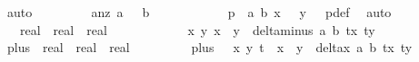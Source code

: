 \begin{isabellebody}
\ auto\ \isanewline
\ \ \ \ \ \ \isamarkupfalse%
\ a{}{\isacharunderscore}nz{\isacharcolon}\ {\isachardoublequoteopen}a{}\ {\isasymnoteq}\ {}{\isachardoublequoteclose}\ {\isachardoublequoteopen}b{}\ {\isasymnoteq}\ {}{\isachardoublequoteclose}\isanewline
\ \ \ \ \ \ \ \ \isamarkupfalse%
\ {\isacartoucheopen}p\ {\isacharequal}\ {\isacharparenleft}a{}{\isacharcomma}\ b{}{\isacharparenright}{\isacartoucheclose}\ {\isacartoucheopen}x{}\ {\isasymnoteq}\ {}{\isacartoucheclose}\ {\isacartoucheopen}y{}\ {\isasymnoteq}\ {}{\isacartoucheclose}\ p{\isacharunderscore}def\ \isamarkupfalse%
\ auto\isanewline
\ \ \ \ \ \ \isamarkupfalse%
\ {\isasymdelta}{\isacharprime}\ {\isacharcolon}{\isacharcolon}\ {\isachardoublequoteopen}real\ {\isasymRightarrow}\ real\ {\isasymRightarrow}\ real{\isachardoublequoteclose}\ \ \isanewline
\ \ \ \ \ \ \ \ {\isachardoublequoteopen}{\isasymdelta}{\isacharprime}{\isacharequal}\ {\isacharparenleft}{\isasymlambda}\ x{}\ y{}{\isachardot}\ x{}\ {\isacharasterisk}\ y{}\ {\isacharasterisk}\ delta{\isacharunderscore}minus\ a{}\ b{}\ {\isacharparenleft}{}{\isacharslash}{\isacharparenleft}t{\isacharasterisk}x{}{\isacharparenright}{\isacharparenright}\ {\isacharparenleft}{}{\isacharslash}{\isacharparenleft}t{\isacharasterisk}y{}{\isacharparenright}{\isacharparenright}{\isacharparenright}{\isachardoublequoteclose}\ \isanewline
\ \ \ \ \ \ \isamarkupfalse%
\ {\isasymdelta}{\isacharunderscore}plus\ {\isacharcolon}{\isacharcolon}\ {\isachardoublequoteopen}real\ {\isasymRightarrow}\ real\ {\isasymRightarrow}\ real{\isachardoublequoteclose}\ \isanewline
\ \ \ \ \ \ \ \ {\isachardoublequoteopen}{\isasymdelta}{\isacharunderscore}plus\ {\isacharequal}\ {\isacharparenleft}{\isasymlambda}\ x{}\ y{}{\isachardot}\ t\ {\isacharasterisk}\ x{}\ {\isacharasterisk}\ y{}\ {\isacharasterisk}\ delta{\isacharunderscore}x\ a{}\ b{}\ {\isacharparenleft}{}{\isacharslash}{\isacharparenleft}t{\isacharasterisk}x{}{\isacharparenright}{\isacharparenright}\ {\isacharparenleft}{}{\isacharslash}{\isacharparenleft}t{\isacharasterisk}y{}{\isacharparenright}{\isacharparenright}{\isacharparenright}{\isachardoublequoteclose}\isanewline

\end{isabellebody}
